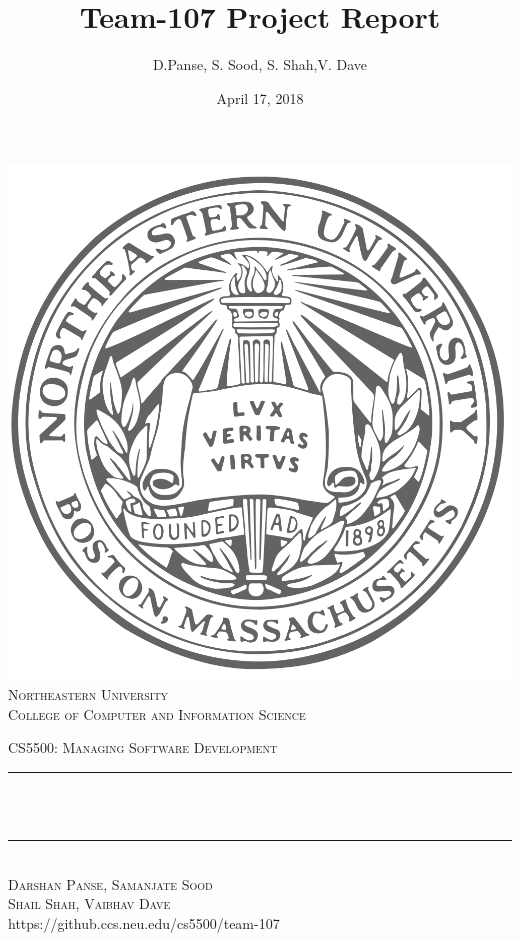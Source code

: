 \documentclass[12pt]{article}
\title{Team-107 Project Report}
\author{D.Panse, S. Sood, S. Shah,V. Dave}
\date{April 17, 2018}
\makeatletter
\let\thetitle\@title
\let\thedate\@date
\def\thecourse{CS5500: Managing Software Development}
\def\theuniversity{Northeastern University}
\def\thecollege{College of Computer and Information Science}
\def\thegithuburl{https://github.ccs.neu.edu/cs5500/team-107}
\makeatother
\begin{document}

\begin{titlepage}
	\centering
    \includegraphics[scale = 0.20]{seal.png}\\[0.2cm]	
    \textsc{\LARGE \color{huskyred} \theuniversity\\[0.5mm]}	
	\textsc{\small \thecollege \\[1.5 cm]}	
    
    \textsc{\Large \thecourse }\\[0.5 cm]
    
	\rule{\linewidth}{0.2 mm} \\[0.4 cm]
	{ \huge \bfseries \thetitle}\\
	\rule{\linewidth}{0.2 mm} \\[1.5 cm]
	
	\textsc{\LARGE Darshan Panse, Samanjate Sood}\\[0.5 mm]
    \textsc{\LARGE Shail Shah, Vaibhav Dave}\\[0.5 mm]
    \thegithuburl\\[1.5 cm]
    \textsc{\LARGE \thedate}\\[2.0 cm]  
    
\end{titlepage}
\end{document}
